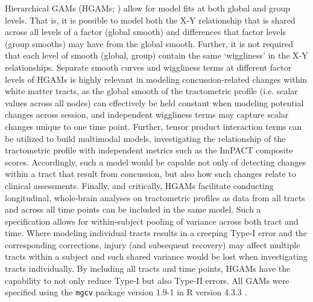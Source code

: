 \documentclass[12pt]{article}
\begin{document}
Hierarchical GAMs (HGAMs; \cite{pedersen2019HierarchicalGeneralizedAdditive}) allow for model fits at both global and group levels. That is, it is possible to model both the X-Y relationship that is shared across all levels of a factor (global smooth) and differences that factor levels (group smooths) may have from the global smooth. Further, it is not required that each level of smooth (global, group) contain the same `wiggliness' in the X-Y relationships. Separate smooth curves and wiggliness terms at different factor levels of HGAMs is highly relevant in modeling concussion-related changes within white matter tracts, as the global smooth of the tractometric profile (i.e. scalar values across all nodes) can effectively be held constant when modeling potential changes across session, and independent wiggliness terms may capture scalar changes unique to one time point. Further, tensor product interaction terms can be utilized to build multimodal models, investigating the relationship of the tractometric profile with independent metrics such as the ImPACT composite scores. Accordingly, such a model would be capable not only of detecting changes within a tract that result from concussion, but also how such changes relate to clinical assessments. Finally, and critically, HGAMs facilitate conducting longitudinal, whole-brain analyses on tractometric profiles as data from all tracts and across all time points can be included in the same model. Such a specification allows for within-subject pooling of variance across both tract and time. Where modeling individual tracts results in a creeping Type-I error and the corresponding corrections, injury (and subsequent recovery) may affect multiple tracts within a subject and such shared variance would be lost when investigating tracts individually. By including all tracts and time points, HGAMs have the capability to not only reduce Type-I but also Type-II errors. All GAMs were specified using the \lstinline{mgcv} package version 1.9-1 \parencite{wood2017GeneralizedAdditiveModels} in R version 4.3.3 \parencite{rcoreteam2023LanguageEnvironmentStatistical}.

\end{document}
